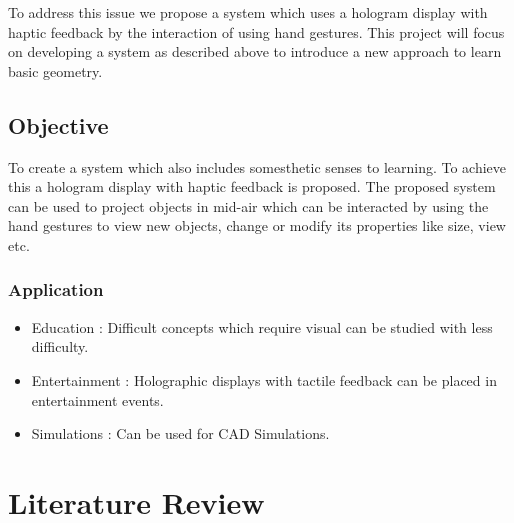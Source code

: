 \documentclass{fisatproject}
\begin{document}
\par To address this issue  we propose a system which uses a hologram display with haptic feedback by the interaction of using hand gestures. This project will focus on developing a system as described above to introduce a new approach to learn basic geometry.

\section{Objective}

To create a system which also includes somesthetic senses to learning. To achieve this a hologram display with haptic feedback is proposed. The proposed system can be used to project objects in mid-air which can be interacted by using the hand gestures to view new objects, change or modify its properties like size, view etc.
\subsection{Application}
\begin{itemize}
    \item  Education : Difficult concepts which require visual can be studied with less difficulty. 
    \item  Entertainment : Holographic displays with tactile feedback can be placed in entertainment events.
    \item  Simulations : Can be used for CAD Simulations.
\end{itemize}
\chapter{Literature Review}
\end{document}
